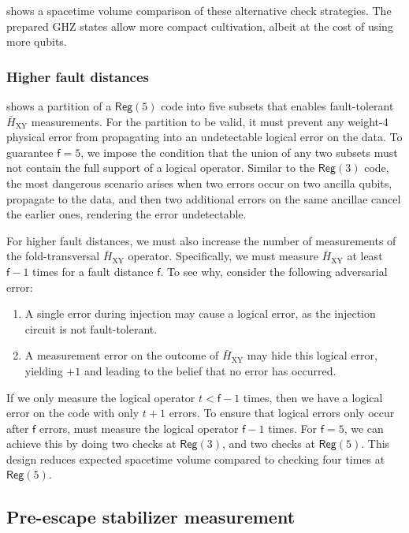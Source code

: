 \documentclass[%
    aps, 
    physrev,
    reprint,
]{revtex4-2}
\newcommand{\fd}[1]{\mathsf{f}=#1}
\newcommand{\reg}[1]{\mathsf{Reg}(#1)}
\newcommand{\XY}{_\mathrm{XY}}
\begin{document}
 shows a spacetime volume comparison of these alternative check strategies. 
The prepared GHZ states allow more compact cultivation, albeit at the cost of using more qubits.

\subsubsection{{Higher fault distances}}

 shows a partition of a $\reg{5}$ code into five subsets that enables fault-tolerant $\bar{H}\XY$ measurements. 
For the partition to be valid, it must prevent any weight-4 physical error from propagating into an undetectable logical error on the data.
To guarantee $\fd5$, we impose the condition that the union of any two subsets must not contain the full support of a logical operator. 
Similar to the $\reg3$ code, the most dangerous scenario arises when two errors occur on two ancilla qubits, propagate to the data, and then two additional errors on the same ancillae cancel the earlier ones, rendering the error undetectable.

For higher fault distances, we must also increase the number of measurements of the fold-transversal $\bar{H}\XY$ operator. 
Specifically, we must measure $\bar{H}\XY$ at least $\mathsf{f}-1$ times for a fault distance $\mathsf{f}$. 
To see why, consider the following adversarial error:
\begin{enumerate}
    \item A single error during injection may cause a logical error, as the injection circuit is not fault-tolerant.
    \item A measurement error on the outcome of $\bar{H}\XY$ may hide this logical error, yielding $+1$ and leading to the belief that no error has occurred.
\end{enumerate}
If we only measure the logical operator $t < \mathsf{f}-1$ times, then we have a logical error on the code with only $t+1$ errors.
To ensure that logical errors only occur after $\mathsf{f}$ errors, must measure the logical operator $\mathsf{f}-1$ times. 
For $\fd5$, we can achieve this by doing two checks at $\reg3$, and two checks at $\reg{5}$. 
This design reduces expected spacetime volume compared to checking four times at $\reg{5}$.

\subsection{Pre-escape stabilizer measurement}\label{app:regps}
\end{document}
